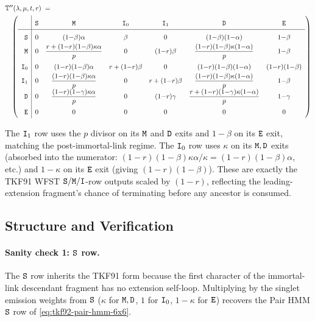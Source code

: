 \begin{eqnarray}
\lefteqn{\tkfwfst''(\insrate,\delrate,\evoltime,\ext) \;= \quad} \label{eq:tkf92-wfst} \\
& & \renewcommand{\arraystretch}{1.7}
\left(
\begin{array}{r|cccccc}
& \sta & \mat & \ins_0 & \ins_1 & \del & \fin \\\hline
\sta   & 0 & (1{-}\beta)\alpha
            & \beta
            & 0
            & (1{-}\beta)(1{-}\alpha)
            & 1{-}\beta \\
\mat   & 0 & \dfrac{r + (1{-}r)(1{-}\beta)\kappa\alpha}{p}
            & 0
            & (1{-}r)\beta
            & \dfrac{(1{-}r)(1{-}\beta)\kappa(1{-}\alpha)}{p}
            & 1{-}\beta \\
\ins_0 & 0 & (1{-}r)(1{-}\beta)\alpha
            & r + (1{-}r)\beta
            & 0
            & (1{-}r)(1{-}\beta)(1{-}\alpha)
            & (1{-}r)(1{-}\beta) \\
\ins_1 & 0 & \dfrac{(1{-}r)(1{-}\beta)\kappa\alpha}{p}
            & 0
            & r + (1{-}r)\beta
            & \dfrac{(1{-}r)(1{-}\beta)\kappa(1{-}\alpha)}{p}
            & 1{-}\beta \\
\del   & 0 & \dfrac{(1{-}r)(1{-}\gamma)\kappa\alpha}{p}
            & 0
            & (1{-}r)\gamma
            & \dfrac{r + (1{-}r)(1{-}\gamma)\kappa(1{-}\alpha)}{p}
            & 1{-}\gamma \\
\fin   & 0 & 0 & 0 & 0 & 0 & 0
\end{array}
\right) \nonumber
\end{eqnarray}

The ${\tt I}_1$ row uses the $p$ divisor on its ${\tt M}$ and ${\tt D}$ exits
and $1{-}\beta$ on its ${\tt E}$ exit, matching the post-immortal-link
regime.  The ${\tt I}_0$ row uses $\kappa$ on its ${\tt M},{\tt D}$ exits
(absorbed into the numerator: $(1{-}r)(1{-}\beta)\kappa\alpha/\kappa
= (1{-}r)(1{-}\beta)\alpha$, etc.) and $1{-}\kappa$ on its ${\tt E}$
exit (giving $(1{-}r)(1{-}\beta)$).  These are exactly the TKF91
WFST ${\tt S}/{\tt M}/{\tt I}$-row outputs scaled by $(1{-}r)$, reflecting
the leading-extension fragment's chance of terminating before any
ancestor is consumed.

\subsection{Structure and Verification}
\label{sec:wfst92-verification}

\paragraph{Sanity check 1: ${\tt S}$ row.}
The ${\tt S}$ row inherits the TKF91 form because the first character
of the immortal-link descendant fragment has no extension self-loop.
Multiplying by the singlet emission weights from ${\tt S}$
($\kappa$ for ${\tt M},{\tt D}$, $1$ for ${\tt I}_0$, $1{-}\kappa$ for ${\tt E}$)
recovers the Pair HMM ${\tt S}$ row of \eqref{eq:tkf92-pair-hmm-6x6}.

